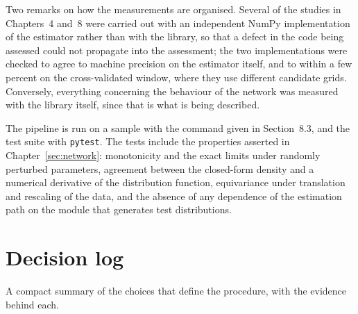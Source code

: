 \documentclass[11pt]{article}
\begin{document}
Two remarks on how the measurements are organised. Several of the studies in Chapters~4 and~8
were carried out with an independent NumPy implementation of the estimator rather than with
the library, so that a defect in the code being assessed could not propagate into the
assessment; the two implementations were checked to agree to machine precision on the
estimator itself, and to within a few percent on the cross-validated window, where they use
different candidate grids. Conversely, everything concerning the behaviour of the network was
measured with the library itself, since that is what is being described.

The pipeline is run on a sample with the command given in Section~8.3, and the test suite
with \texttt{pytest}. The tests include the properties asserted in
Chapter~\ref{sec:network}: monotonicity and the exact limits under randomly perturbed
parameters, agreement between the closed-form density and a numerical derivative of the
distribution function, equivariance under translation and rescaling of the data, and the
absence of any dependence of the estimation path on the module that generates test
distributions.

\section{Decision log}
\label{app:decisions}

A compact summary of the choices that define the procedure, with the evidence behind each.
\end{document}
